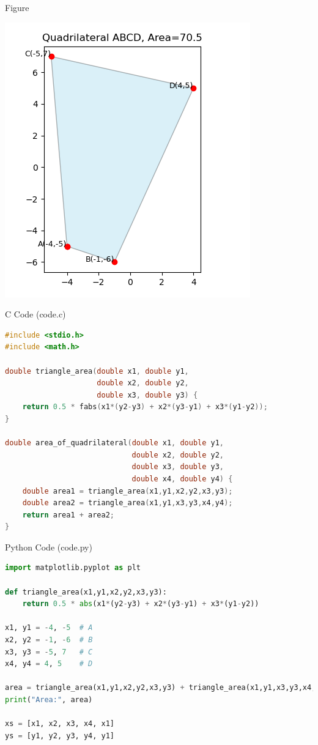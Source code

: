 \documentclass{beamer}
\begin{document}
\begin{frame}{Figure}
\begin{center}
\includegraphics[width=0.6\columnwidth]{figs/fig.png}
\end{center}

\end{frame}
\begin{frame}[fragile]{C Code (code.c)}
\begin{lstlisting}[language=C]
#include <stdio.h>
#include <math.h>

double triangle_area(double x1, double y1,
                     double x2, double y2,
                     double x3, double y3) {
    return 0.5 * fabs(x1*(y2-y3) + x2*(y3-y1) + x3*(y1-y2));
}

double area_of_quadrilateral(double x1, double y1,
                             double x2, double y2,
                             double x3, double y3,
                             double x4, double y4) {
    double area1 = triangle_area(x1,y1,x2,y2,x3,y3);
    double area2 = triangle_area(x1,y1,x3,y3,x4,y4);
    return area1 + area2;
}
\end{lstlisting}
\end{frame}
\begin{frame}[fragile]{Python Code (code.py)}
\begin{lstlisting}[language=Python]
import matplotlib.pyplot as plt

def triangle_area(x1,y1,x2,y2,x3,y3):
    return 0.5 * abs(x1*(y2-y3) + x2*(y3-y1) + x3*(y1-y2))

x1, y1 = -4, -5  # A
x2, y2 = -1, -6  # B
x3, y3 = -5, 7   # C
x4, y4 = 4, 5    # D

area = triangle_area(x1,y1,x2,y2,x3,y3) + triangle_area(x1,y1,x3,y3,x4,y4)
print("Area:", area)

xs = [x1, x2, x3, x4, x1]
ys = [y1, y2, y3, y4, y1]
\end{lstlisting}
\end{frame}
\end{document}
